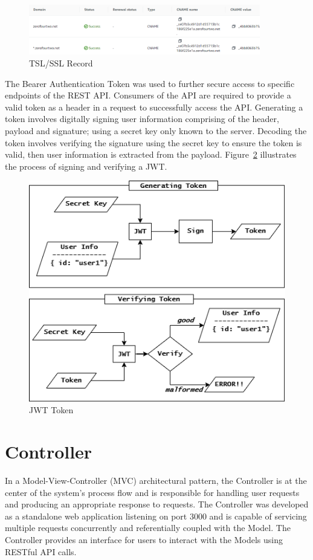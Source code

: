 \begin{figure}[h!]
    \begin{center}
        \includegraphics[width=0.9\textwidth]{images/ssl_record.png}
        \caption{TSL/SSL Record}
        \label{image:ssl_record}
    \end{center}
\end{figure}

The Bearer Authentication Token was used to further secure access to specific endpoints of the REST API. Consumers of the API are required to 
provide a valid token as a header in a request to successfully access the API. Generating a token involves digitally signing user information 
comprising of the header, payload and signature; using a secret key only known to the server. Decoding the token involves verifying the signature 
using the secret key to ensure the token is valid, then user information is extracted from the payload. Figure~\ref{image:jwt} illustrates the 
process of signing and verifying a JWT. 

\begin{figure}[h!]
    \begin{center}
        \includegraphics[height=0.4\textwidth]{images/jwt.png}
        \caption{JWT Token}
        \label{image:jwt}
    \end{center}
\end{figure}


\section{Controller}
In a Model-View-Controller (MVC) architectural pattern, the Controller is at the center of the system's process flow and is responsible for 
handling user requests and producing an appropriate response to requests. The Controller was developed as a standalone web application
listening on port 3000 and is capable of servicing multiple requests concurrently and referentially coupled with the Model. The Controller
provides an interface for users to interact with the Models using RESTful API calls. 

